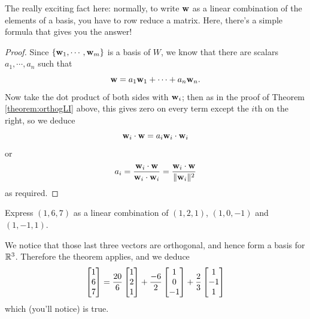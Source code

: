 The really exciting fact here:  normally, to write $\mathbf{w}$ as a linear
combination of the elements of a basis, you have to row reduce a
matrix.  Here, there's a simple formula that gives you the answer!

\begin{proof}
Since  $\{\mathbf{w}_1, \cdots, \mathbf{w}_m\}$ is a basis of $W$, we know that there
are scalars $a_1, \cdots, a_n$ such that 
$$
\mathbf{w} = a_1\mathbf{w}_1 + \cdots + a_n\mathbf{w}_n.
$$
Now take the dot product of both sides with $\mathbf{w}_i$; then as in the
proof of  Theorem \ref{theorem:orthogLI} above, this gives zero on every term except
the $i$th on the right, so we deduce
$$
\mathbf{w}_i \cdot \mathbf{w} = a_i \mathbf{w}_i \cdot \mathbf{w}_i
$$
or
$$
a_i = \frac{\mathbf{w}_i \cdot \mathbf{w} }{\mathbf{w}_i \cdot \mathbf{w}_i} = \frac{\mathbf{w}_i \cdot \mathbf{w} }{\Vert \mathbf{w}_i\Vert^2}
$$
as required.
\end{proof}

\begin{myprob} Express $(1,6,7)$ as a linear combination of $(1,2,1)$, $(1,0,-1)$
and $(1,-1,1)$.

\begin{mysol} We notice that those last three vectors are orthogonal, and hence form
a basis for $\mathbb{R}^3$.  Therefore the theorem applies, and we deduce
$$
\left[ \begin{matrix} 1\\6\\7 \end{matrix} \right] = \frac{20}{6}\left[ \begin{matrix} 1\\2\\1 \end{matrix} \right] + \frac{-6}{2}\left[ \begin{matrix} 1\\0\\-1 \end{matrix} \right] + \frac{2}{3}\left[ \begin{matrix} 1\\-1\\1 \end{matrix} \right]
$$
which (you'll notice) is true.
\end{mysol}\end{myprob}


